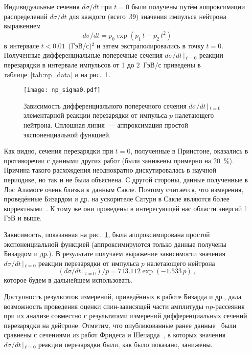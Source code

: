 Индивидуальные сечения $d\sigma/dt$ при $t=0$ были получены путём аппроксимации
распределений $d\sigma/dt$ для каждого (всего~39) значения импульса нейтрона
выражением
\begin{equation} \label{eq:exp2}
  d\sigma/dt = p_0\exp(p_1\,t + p_2\,t^2)
\end{equation}
в интервале $t < 0.01$~(ГэВ/с)$^2$ и затем экстраполировались в точку $t=0$.
Полученные дифференциальные поперечные сечения $d\sigma/dt\,|\,_{t=0}$ реакции
перезарядки \np в интервале импульсов от 1 до 2~ГэВ/с приведены в
таблице~\ref{tab:np_data} и на рис.~\ref{fig:np_sigma0}.



\begin{figure}[h]
  \centering
  \texttt{[image: np\_sigma0.pdf]}
  \caption{Зависимость дифференциального поперечного сечения
    $d\sigma/dt\,|\,_{t=0}$ элементарной реакции перезарядки \np от импульса $p$
    налетающего нейтрона. Сплошная линия~--- аппроксимация простой
    экспоненциальной функцией.}
  \label{fig:np_sigma0}
\end{figure}

Как видно, сечения перезарядки при $t=0$, полученные в Принстоне, оказались в
противоречии с данными других работ (были занижены примерно на 20~$\%$). Причина
такого расхождения неоднократно дискутировалась в научной периодике, но так и не
была объяснена. С другой стороны, данные полученные в Лос Аламосе очень близки к
данным Сакле. Поэтому считается, что измерения, проведённые Бизардом и др. на
ускорителе Сатурн в Сакле являются более корректными~\cite{biz75,bys78,nn_web}.
К тому же они проведены в интересующей нас области энергий 1 ГэВ и выше.

Зависимость, показанная на рис.~\ref{fig:np_sigma0}, была аппроксимирована
простой экспоненциальной функцией (аппроксимируются только данные получены
Бизардом и др.). В результате получаем выражение зависимости значения
$d\sigma/dt\,|\,_{t=0}$ реакции перезарядки \np от импульса $p$ налетающего
нейтрона
\begin{equation}
  \label{eq:np0}
  (d\sigma/dt\,|\,_{t=0})/p = 713.112 \exp(-1.533\,p)\,,
\end{equation}
которое будем в дальнейшем использовать.

Доступность результатов измерений, приведённых в работе Бизарда и др., дала
возможность проведения оценки спин-зависящей части амплитуды $np$-рассеяния при
их анализе совместно с результатами измерений дифференциальных сечений
перезарядки на дейтроне. Отметим, что опубликованные ранее данные~\cite{mucha02}
были сравнены с сечениями из работ Фридеса и
Шепарда~\cite{friedes65,shep69,shep74}, в которых значения
$d\sigma/dt\,|\,_{t=0}$ реакции перезарядки \np были, как было показано,
занижены.

